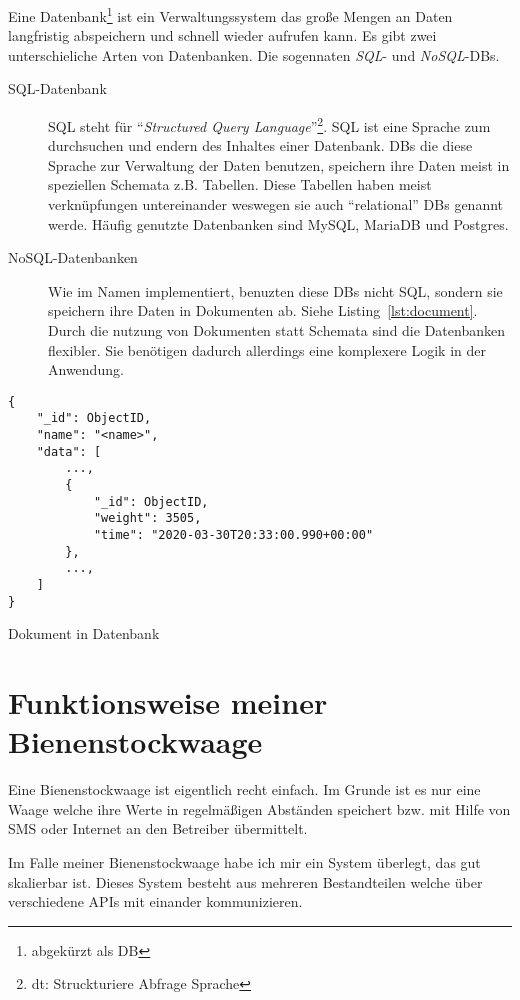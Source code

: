 \documentclass[a4paper, ngerman, 12pt]{scrartcl}
\begin{document}
Eine Datenbank\footnote{abgekürzt als DB} ist ein Verwaltungssystem das große Mengen an Daten langfristig abspeichern und schnell wieder aufrufen kann.
Es gibt zwei unterschieliche Arten von Datenbanken. Die sogennaten \emph{SQL}- und \emph{NoSQL}-DBs.

\begin{description}
	\item[SQL-Datenbank] SQL steht für \enquote{\emph{Structured Query Language}}\footnote{dt: Struckturiere Abfrage Sprache}.
		SQL ist eine Sprache zum durchsuchen und endern des Inhaltes einer Datenbank.
		DBs die diese Sprache zur Verwaltung der Daten benutzen, speichern ihre Daten meist in speziellen Schemata z.B. Tabellen.
		Diese Tabellen haben meist verknüpfungen untereinander weswegen sie auch \enquote{relational} DBs genannt werde.
		Häufig genutzte Datenbanken sind MySQL, MariaDB und Postgres.
	\item[NoSQL-Datenbanken] Wie im Namen implementiert, benuzten diese DBs nicht SQL, sondern sie speichern ihre Daten in Dokumenten ab. Siehe Listing~\ref{lst:document}.
		Durch die nutzung von Dokumenten statt Schemata sind die Datenbanken flexibler.
		Sie benötigen dadurch allerdings eine komplexere Logik in der Anwendung.
\end{description}

\begin{listing}[H]
\begin{verbatim}
{
    "_id": ObjectID,
    "name": "<name>",
    "data": [
        ...,
        {
            "_id": ObjectID,
            "weight": 3505,
            "time": "2020-03-30T20:33:00.990+00:00"
        },
        ...,
    ]
}
\end{verbatim}
\caption{Dokument in Datenbank\label{lst:document}}
\end{listing}
\section{Funktionsweise meiner Bienenstockwaage}\label{sec:function}

Eine Bienenstockwaage ist eigentlich recht einfach.
Im Grunde ist es nur eine Waage welche ihre Werte in regelmäßigen Abständen speichert bzw.
mit Hilfe von SMS oder Internet an den Betreiber übermittelt.

Im Falle meiner Bienenstockwaage habe ich mir ein System überlegt, das gut skalierbar ist.
Dieses System besteht aus mehreren Bestandteilen welche über verschiedene APIs mit einander kommunizieren.
\end{document}
